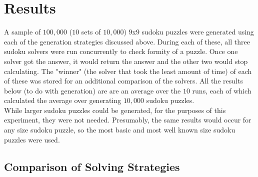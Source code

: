 
\section{Results}

A sample of $100,000$ ($10$ sets of $10,000$) $9$x$9$ sudoku puzzles were generated using each of the generation strategies discussed above.
During each of these, all three sudoku solvers were run concurrently to check formity of a puzzle. Once one solver got the answer,
it would return the answer and the other two would stop calculating. The "winner" (the solver that took the least amount of time) of each
of these was stored for an additional comparison of the solvers. All the results below (to do with generation) are are an average over
the $10$ runs, each of which calculated the average over generating $10,000$ sudoku puzzles.\\
While larger sudoku puzzles could be generated, for the purposes of this experiment, they were not needed. Presumably, the same results
would occur for any size sudoku puzzle, so the most basic and most well known size sudoku puzzles were used.

\subsection{Comparison of Solving Strategies}

